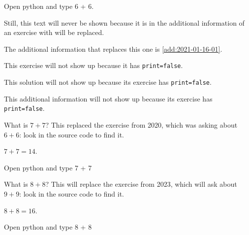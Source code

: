 \documentclass{book}
\begin{document}
\begin{additionalinformation}
Open python and type 6 + 6.

Still, this text will never be shown because it is in the additional information of an exercise with will be replaced.

The additional information that replaces this one is \cref{add:2021-01-16-01}.
\end{additionalinformation}

\begin{exercise}[print=false]
This exercise will not show up because it has \texttt{print=false}.
\end{exercise}

\begin{solution}
This solution will not show up because its exercise has \texttt{print=false}.
\end{solution}

\begin{additionalinformation}
This additional information will not show up because its exercise has \texttt{print=false}.
\end{additionalinformation}

\begin{exercise}[examdate={January 16, 2021}, examproblemnumber={1}, examproblemid={2021-01-16-01}]
  What is \(7 + 7\)? This replaced the exercise from 2020, which was asking about \(6 + 6\): look in the source code to find it.
\end{exercise}

\begin{solution}
  \(7 + 7 = 14\).
\end{solution}

\begin{additionalinformation}
Open python and type 7 + 7
\end{additionalinformation}

\begin{exercise}[examdate={January 16, 2022}, examproblemnumber={1}, examproblemid={2022-01-16-01}]
  What is \(8 + 8\)? This will replace the exercise from 2023, which will ask about \(9 + 9\): look in the source code to find it.
\end{exercise}

\begin{solution}
  \(8 + 8 = 16\).
\end{solution}

\begin{additionalinformation}
Open python and type 8 + 8
\end{additionalinformation}
\end{document}
